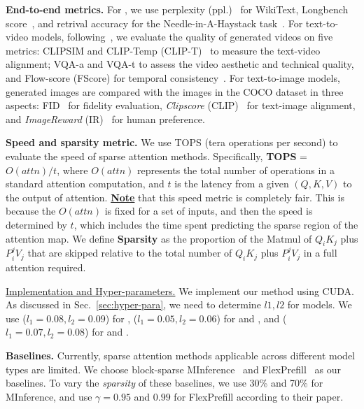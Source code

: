 \noindent \noindent\textbf{End-to-end metrics.}   
For \llamal, we use perplexity (ppl.)~\cite{jelinek1977perplexity} for WikiText, Longbench score~\cite{bai2023longbench}, and retrival accuracy for the Needle-in-A-Haystack task~\cite{LLMTest_NeedleInAHaystack}.
For text-to-video models, following~\citet{zhao2024viditq}, we evaluate the quality of generated videos on five metrics: CLIPSIM and CLIP-Temp (CLIP-T)~\cite{liu2024evalcrafter} to measure the text-video alignment; VQA-a and VQA-t to assess the video aesthetic and technical quality, and Flow-score (FScore) for temporal consistency~\cite{wu2023exploring}. 
For text-to-image models, generated images are compared with the images in the COCO dataset in three aspects: FID~\cite{heusel2017gans} for fidelity evaluation, \textit{Clipscore} (CLIP)~\cite{hessel2021clipscore} for text-image alignment, and \textit{ImageReward} (IR)~\cite{xu2024imagereward} for human preference.

\noindent \noindent\textbf{Speed and sparsity metric.} We use TOPS (tera operations per second) to evaluate the speed of sparse attention methods. Specifically, \textbf{TOPS} = $O(attn)/t$, where $O(attn)$ represents the total number of operations in a standard attention computation, and $t$ is the latency from a given $(Q, K, V)$ to the output of attention. \uline{\textbf{Note}} that this speed metric is completely fair. This is because the $O(attn)$ is fixed for a set of inputs, and then the speed is determined by $t$, which includes the time spent predicting the sparse region of the attention map.
We define \textbf{Sparsity} as the proportion of the Matmul of $Q_iK_j$ plus $P_i^jV_j$ that are skipped relative to the total number of $Q_iK_j$ plus $P_i^jV_j$ in a full attention required.


\noindent \underline{Implementation and Hyper-parameters.} We implement our method using CUDA. As discussed in Sec.~\ref{sec:hyper-para}, we need to determine $l1, l2$ for models. We use ($l_1=0.08, l_2=0.09$) for \llamal, ($l_1=0.05, l_2=0.06$) for \cogvideo and \mochi, and ($l_1=0.07, l_2=0.08$) for \sd and \flux.


\noindent \textbf{Baselines.} Currently, sparse attention methods applicable across different model types are limited. We choose block-sparse MInference~\cite{jiang2407minference} and FlexPrefill~\cite{FlexPrefill} as our baselines. To vary the \emph{sparsity} of these baselines, we use 30\% and 70\% for MInference, and use $\gamma=0.95$ and $0.99$ for FlexPrefill according to their paper.



